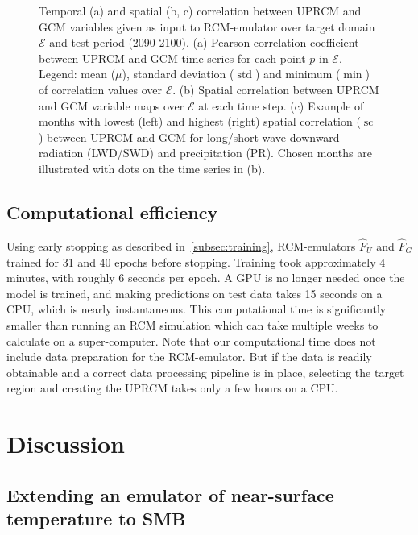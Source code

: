 \documentclass[a4paper,11pt,oneside]{report}
\begin{document}
\begin{figure}[!h]
\begin{subfigure}[b]{\columnwidth}
        \end{subfigure}
        \hfill
        \caption[]
        {\small Temporal (a) and spatial (b, c) correlation between UPRCM and GCM variables given as input to RCM-emulator over target domain $\mathcal{E}$ and test period (2090-2100). (a) Pearson correlation coefficient between UPRCM and GCM time series for each point $p$ in $\mathcal{E}$. Legend: mean ($\mu$), standard deviation ($\operatorname{std}$) and minimum ($\min$) of correlation values over $\mathcal{E}$. (b) Spatial correlation between UPRCM and GCM variable maps over $\mathcal{E}$ at each time step. (c) Example of months with lowest (left) and highest (right) spatial correlation ($\operatorname{sc}$) between UPRCM and GCM for long/short-wave downward radiation (LWD/SWD) and precipitation (PR). Chosen months are illustrated with dots on the time series in (b).} 
        \label{fig:corr-GCM-RCM}
    \end{figure}


\section{Computational efficiency}\label{sec:computational-efficiency}
Using early stopping as described in~\autoref{subsec:training}, RCM-emulators $\hat{F}_U$ and $\hat{F}_G$ trained for 31 and 40 epochs before stopping. Training took approximately 4 minutes, with roughly 6 seconds per epoch. A GPU is no longer needed once the model is trained, and making predictions on test data takes 15 seconds on a CPU, which is nearly instantaneous. This computational time is significantly smaller than running an RCM simulation which can take multiple weeks to calculate on a super-computer. Note that our computational time does not include data preparation for the RCM-emulator. But if the data is readily obtainable and a correct data processing pipeline is in place, selecting the target region and creating the UPRCM takes only a few hours on a CPU.



\chapter{Discussion}

\section{Extending an emulator of near-surface temperature to SMB}\label{sec:extension-doury}
\end{document}
